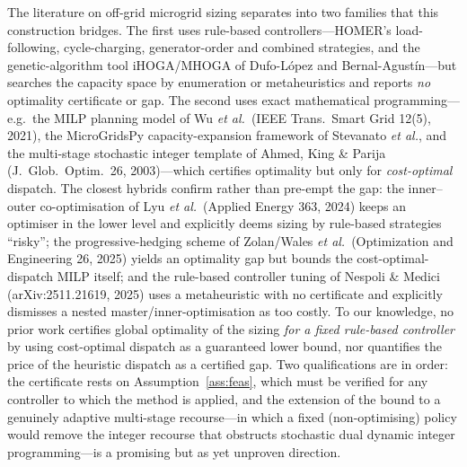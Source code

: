 \documentclass[11pt,a4paper]{article}
\theoremstyle{plain}
\theoremstyle{definition}
\begin{document}
The literature on off-grid microgrid sizing separates into two families that this
construction bridges. The first uses rule-based controllers---HOMER's load-following,
cycle-charging, generator-order and combined strategies, and the genetic-algorithm tool
iHOGA/MHOGA of Dufo-L\'opez and Bernal-Agust\'in---but searches the capacity space by
enumeration or metaheuristics and reports \emph{no} optimality certificate or gap. The
second uses exact mathematical programming---e.g.\ the MILP planning model of Wu \emph{et
al.}\ (IEEE Trans.\ Smart Grid 12(5), 2021), the MicroGridsPy capacity-expansion framework
of Stevanato \emph{et al.}, and the multi-stage stochastic integer template of Ahmed,
King \& Parija (J.\ Glob.\ Optim.\ 26, 2003)---which certifies optimality but only for
\emph{cost-optimal} dispatch. The closest hybrids confirm rather than pre-empt the gap:
the inner--outer co-optimisation of Lyu \emph{et al.}\ (Applied Energy 363, 2024) keeps an
optimiser in the lower level and explicitly deems sizing by rule-based strategies
``risky''; the progressive-hedging scheme of Zolan/Wales \emph{et al.}\ (Optimization and
Engineering 26, 2025) yields an optimality gap but bounds the cost-optimal-dispatch MILP
itself; and the rule-based controller tuning of Nespoli \& Medici (arXiv:2511.21619, 2025)
uses a metaheuristic with no certificate and explicitly dismisses a nested
master/inner-optimisation as too costly. To our knowledge, no prior work certifies global
optimality of the sizing \emph{for a fixed rule-based controller} by using cost-optimal
dispatch as a guaranteed lower bound, nor quantifies the price of the heuristic dispatch as
a certified gap. Two qualifications are in order: the certificate rests on
Assumption~\ref{ass:feas}, which must be verified for any controller to which the method is
applied, and the extension of the bound to a genuinely adaptive multi-stage recourse---in
which a fixed (non-optimising) policy would remove the integer recourse that obstructs
stochastic dual dynamic integer programming---is a promising but as yet unproven direction.
\end{document}
